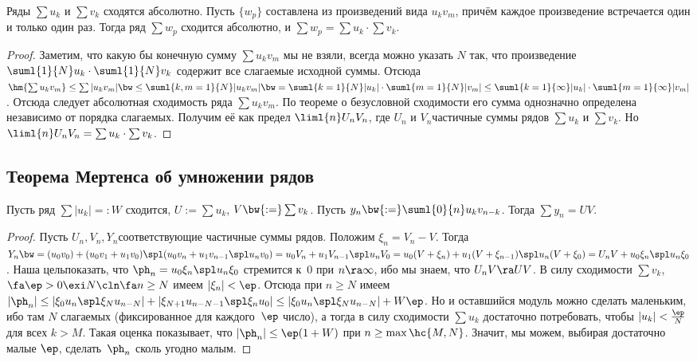 \documentclass[a4paper]{article}
\begin{document}
\begin{theorem}
Ряды $\sum u_k$ и $\sum v_k$ сходятся абсолютно. Пусть $\{w_p\}$ составлена из
произведений вида $u_kv_m$, причём каждое произведение встречается один и только один раз.
Тогда ряд $\sum w_p$ сходится абсолютно, и $\sum w_p= \sum u_k \cdot \sum v_k$.
\end{theorem}
\begin{proof}
Заметим, что какую бы конечную сумму $\sum u_kv_m$ мы не взяли, всегда можно указать $N$ так, что произведение
$\suml{1}{N} u_k \cdot \suml{1}{N} v_k$ содержит все слагаемые исходной суммы. Отсюда
$\hm{\sum u_kv_m} \le \sum |u_kv_m| \bw\le \suml{k,m=1}{N}|u_kv_m| \bw= \suml{k=1}{N} |u_k| \cdot \suml{m=1}{N} |v_m|
\le \suml{k=1}{\infty}|u_k| \cdot \suml{m=1}{\infty} |v_m|$. Отсюда следует абсолютная сходимость ряда
$\sum u_kv_m$. По теореме о безусловной сходимости его сумма однозначно определена независимо от порядка слагаемых.
Получим её как предел $\liml{n} U_nV_n$, где $U_n$ и $V_n$\т частичные суммы рядов $\sum u_k$ и $\sum v_k$.
Но $\liml{n} U_nV_n=\sum u_k \cdot \sum v_k$.
\end{proof}

\subsection{Теорема Мертенса об умножении рядов}

\begin{theorem}[Мертенса]
Пусть ряд $\sum |u_k| =:W$ сходится, $U := \sum u_k$, $V \bw{:=} \sum v_k$. Пусть $y_n \bw{:=} \suml{0}{n}u_kv_{n-k}$.
Тогда $\sum y_n = UV$.
\end{theorem}
\begin{proof}
Пусть $U_n, V_n, Y_n$\т соответствующие частичные суммы рядов. Положим $\xi_n = V_n-V$. Тогда
$Y_n\bw= (u_0v_0)+(u_0v_1+u_1v_0)\spl (u_0v_n+u_1v_{n-1}\spl u_nv_0)=u_0V_n+u_1V_{n-1}\spl u_nV_0=
u_0(V+\xi_n)+u_1(V+\xi_{n-1})\spl u_n(V+\xi_0)=U_nV+u_0\xi_n\spl u_n\xi_0$. Наша цель\т показать, что
$\ph_n=u_0\xi_n\spl u_n\xi_0$ стремится к~0 при $n \ra \infty$, ибо мы знаем, что $U_nV \ra UV$.
В силу сходимости $\sum v_k$, $\fa \ep > 0 \exi N\cln \fa n \ge N$ имеем $|\xi_n|<\ep$. Отсюда при $n \ge N$ имеем
$|\ph_n| \le |\xi_0u_n\spl \xi_Nu_{n-N}| + |\xi_{N+1}u_{n-N-1} \spl \xi_nu_0| \le |\xi_0u_n\spl \xi_Nu_{n-N}| + W\ep$.
Но и оставшийся модуль можно сделать маленьким, ибо там $N$ слагаемых ( фиксированное для каждого~$\ep$ число), а тогда в силу сходимости
$\sum u_k$ достаточно потребовать, чтобы $|u_k| < \frac{\ep}{N}$ для всех $k > M$. Такая оценка показывает, что $|\ph_n| \le \ep(1+W)$
при $n \ge \max \hc{M,N}$.
Значит, мы можем, выбирая достаточно малые $\ep$, сделать~$\ph_n$ сколь угодно малым.
\end{proof}
\end{document}

